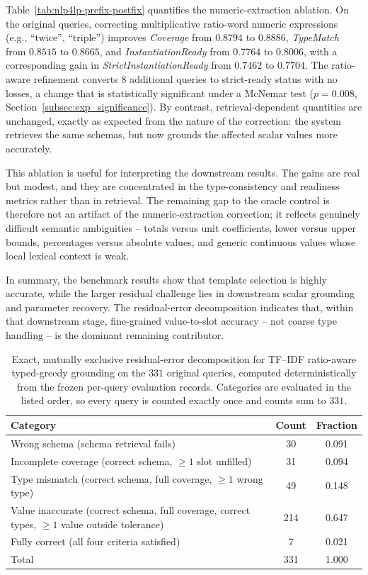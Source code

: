 \documentclass[pdflatex,sn-basic,Numbered]{sn-jnl}
\begin{document}
Table~\ref{tab:nlp4lp-prefix-postfix} quantifies the numeric-extraction ablation. On the original queries, correcting multiplicative ratio-word numeric expressions (e.g., ``twice'', ``triple'') improves \textit{Coverage} from $0.8794$ to $0.8886$, \textit{TypeMatch} from $0.8515$ to $0.8665$, and \textit{InstantiationReady} from $0.7764$ to $0.8006$, with a corresponding gain in \textit{StrictInstantiationReady} from $0.7462$ to $0.7704$. The ratio-aware refinement converts 8 additional queries to strict-ready status with no losses, a change that is statistically significant under a McNemar test ($p=0.008$, Section~\ref{subsec:exp_significance}). By contrast, retrieval-dependent quantities are unchanged, exactly as expected from the nature of the correction: the system retrieves the same schemas, but now grounds the affected scalar values more accurately.

This ablation is useful for interpreting the downstream results. The gains are real but modest, and they are concentrated in the type-consistency and readiness metrics rather than in retrieval. The remaining gap to the oracle control is therefore not an artifact of the numeric-extraction correction; it reflects genuinely difficult semantic ambiguities -- totals versus unit coefficients, lower versus upper bounds, percentages versus absolute values, and generic continuous values whose local lexical context is weak.

In summary, the benchmark results show that template selection is highly accurate, while the larger residual challenge lies in downstream scalar grounding and parameter recovery. The residual-error decomposition indicates that, within that downstream stage, fine-grained value-to-slot accuracy -- not coarse type handling -- is the dominant remaining contributor.

\begin{table}[t]
  \centering
  \caption{Exact, mutually exclusive residual-error decomposition for TF--IDF ratio-aware typed-greedy grounding on the $331$ original queries, computed deterministically from the frozen per-query evaluation records. Categories are evaluated in the listed order, so every query is counted exactly once and counts sum to $331$.}
  \label{tab:nlp4lp-error-taxonomy}
  \small
  \setlength{\tabcolsep}{4pt}
  \begin{tabular}{p{7.4cm}cc}
    \toprule
    Category & Count & Fraction \\
    \midrule
    Wrong schema (schema retrieval fails) & 30 & 0.091 \\
    Incomplete coverage (correct schema, $\geq 1$ slot unfilled) & 31 & 0.094 \\
    Type mismatch (correct schema, full coverage, $\geq 1$ wrong type) & 49 & 0.148 \\
    Value inaccurate (correct schema, full coverage, correct types, $\geq 1$ value outside tolerance) & 214 & 0.647 \\
    Fully correct (all four criteria satisfied) & 7 & 0.021 \\
    \midrule
    Total & 331 & 1.000 \\
    \bottomrule
  \end{tabular}
\end{table}
\end{document}
